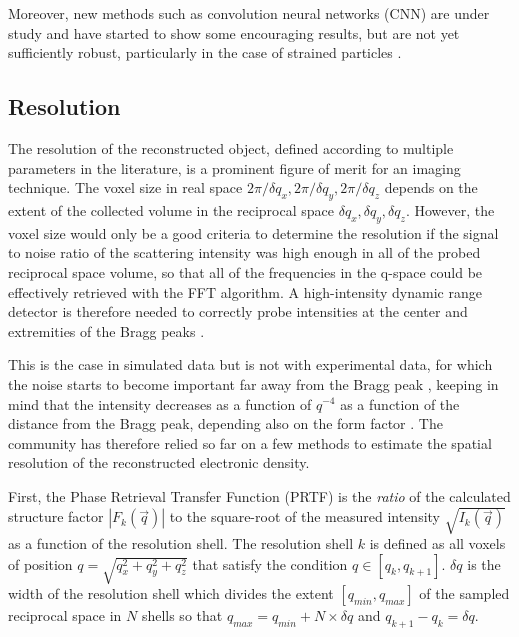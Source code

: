 Moreover, new methods such as convolution neural networks (CNN) are under study and have started to show some encouraging results, but are not yet sufficiently robust, particularly in the case of strained particles \parencite{Cherukara2018, Shen2019, Chan2021, Kim2021a, Wu2021a}.

\subsection{Resolution}

The resolution of the reconstructed object, defined according to multiple parameters in the literature, is a prominent figure of merit for an imaging technique.
The voxel size in real space $2\pi / \delta q_x, 2\pi / \delta q_y, 2\pi / \delta q_z$ depends on the extent of the collected volume in the reciprocal space $\delta q_x, \delta q_y, \delta q_z$.
However, the voxel size would only be a good criteria to determine the resolution if the signal to noise ratio of the scattering intensity was high enough in all of the probed reciprocal space volume, so that all of the frequencies in the q-space could be effectively retrieved with the FFT algorithm.
A high-intensity dynamic range detector is therefore needed to correctly probe intensities at the center and extremities of the Bragg peaks \parencite{Latychevskaia2018}.

This is the case in simulated data but is not with experimental data, for which the noise starts to become important far away from the Bragg peak \parencite{Bikondoa2021}, keeping in mind that the intensity decreases as a function of $q^{-4}$ \parencite{Marchesini2003a} as a function of the distance from the Bragg peak, depending also on the form factor \parencite{Croset2017}.
The community has therefore relied so far on a few methods to estimate the spatial resolution of the reconstructed electronic density.

First, the Phase Retrieval Transfer Function (PRTF) \parencite{Chapman2006} is the \textit{ratio} of the calculated structure factor $|F_k(\vec{q})|$ to the square-root of the measured intensity $\sqrt{I_k(\vec{q})}$ as a function of the resolution shell.
The resolution shell $k$ is defined as all voxels of position $q=\sqrt{q_x^2 + q_y^2 +q_z^2}$ that satisfy the condition $q \in [q_k, q_{k+1}]$.
$\delta q$ is the width of the resolution shell which divides the extent $[q_{min}, q_{max}]$ of the sampled reciprocal space in $N$ shells so that $q_{max} = q_{min} + N \times \delta q$ and $q_{k+1} - q_{k} = \delta q$.

